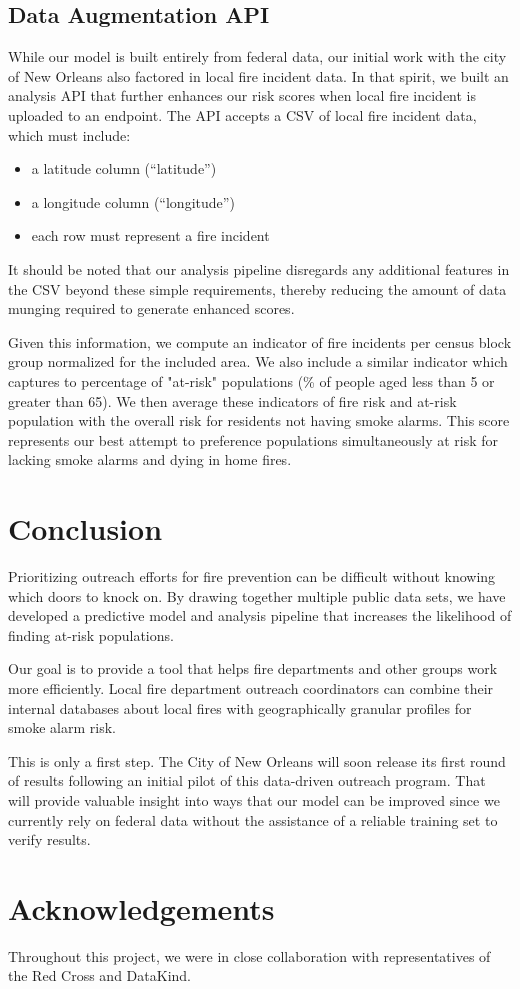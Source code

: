 \documentclass{sig-alternate}
\begin{document}
\subsection{Data Augmentation API}
While our model is built entirely from federal data, our initial work with the city of New Orleans also factored in local fire incident data. In that spirit, we built an analysis API that further enhances our risk scores when local fire incident is uploaded to an endpoint. The API accepts a CSV of local fire incident data, which must include:
\begin{itemize}
\item a latitude column (``latitude'')
\item a longitude column (``longitude'')
\item each row must represent a fire incident
\end{itemize}

It should be noted that our analysis pipeline disregards any additional features in the CSV beyond these simple requirements, thereby reducing the amount of data munging required to generate enhanced scores.

Given this information, we compute an indicator of fire incidents per census block group normalized for the included area. We also include a similar indicator which captures to percentage of "at-risk" populations (\% of people aged less than 5 or greater than 65). We then average these indicators of fire risk and at-risk population with the overall risk for residents not having smoke alarms.  This score represents our best attempt to preference populations simultaneously at risk for lacking smoke alarms and dying in home fires.

\section{Conclusion}

Prioritizing outreach efforts for fire prevention can be difficult without knowing which doors to knock on. By drawing together multiple public data sets, we have developed a predictive model and analysis pipeline that increases the likelihood of finding at-risk populations.

Our goal is to provide a tool that helps fire departments and other groups work more efficiently. Local fire department outreach coordinators can combine their internal databases about local fires with geographically granular profiles for smoke alarm risk. 

This is only a first step. The City of New Orleans will soon release its first round of results following an initial pilot of this data-driven outreach program. That will provide valuable insight into ways that our model can be improved since we currently rely on federal data without the assistance of a reliable training set to verify results. 

\section{Acknowledgements}
Throughout this project, we were in close collaboration with representatives of the Red Cross and DataKind.
\end{document}
